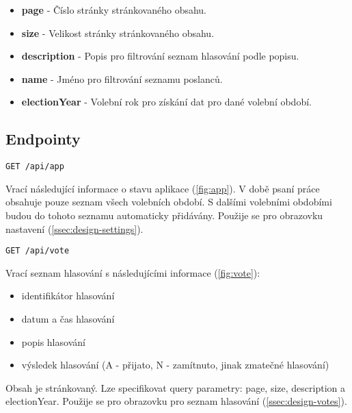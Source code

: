 \begin{itemize}
	\item \textbf{page} - Číslo stránky stránkovaného obsahu.
	\item \textbf{size} - Velikost stránky stránkovaného obsahu.
	\item \textbf{description} - Popis pro filtrování seznam hlasování podle popisu.
	\item \textbf{name} - Jméno pro filtrování seznamu poslanců.
	\item \textbf{electionYear} - Volební rok pro získání dat pro dané volební období.
\end{itemize}

\subsection*{Endpointy}

\begin{lstlisting}[label={lst:endpoint-app}] 
GET /api/app
\end{lstlisting}

\noindent Vrací následující informace o stavu aplikace (\ref{fig:app}). V době psaní práce obsahuje pouze seznam všech volebních období. S dalšími volebními obdobími budou do tohoto seznamu automaticky přidávány. Použije se pro obrazovku nastavení (\ref{ssec:design-settings}).

\vspace{10px}

\begin{lstlisting}[label={lst:endpoint-votes}] 
GET /api/vote
\end{lstlisting}

\noindent Vrací seznam hlasování s následujícími informace (\ref{fig:vote}):
\begin{itemize}
	\item identifikátor hlasování
	\item datum a čas hlasování
	\item popis hlasování
	\item výsledek hlasování (A - přijato, N - zamítnuto, jinak zmatečné hlasování)
\end{itemize}

\noindent Obsah je stránkovaný. Lze specifikovat query parametry: page, size, description a electionYear. Použije se pro obrazovku pro seznam hlasování (\ref{ssec:design-votes}).

\vspace{10px}

